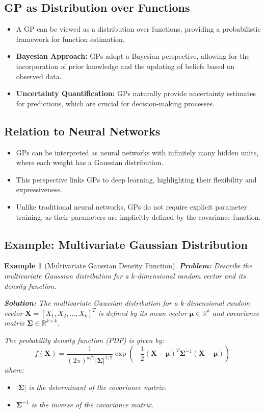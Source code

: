 \documentclass[12pt]{article}
\newtheorem{example}{Example}
\begin{document}
\subsection{GP as Distribution over Functions}
\begin{itemize}
    \item A GP can be viewed as a distribution over functions, providing a probabilistic framework for function estimation.
    \item \textbf{Bayesian Approach:} GPs adopt a Bayesian perspective, allowing for the incorporation of prior knowledge and the updating of beliefs based on observed data.
    \item \textbf{Uncertainty Quantification:} GPs naturally provide uncertainty estimates for predictions, which are crucial for decision-making processes.
\end{itemize}

\subsection{Relation to Neural Networks}
\begin{itemize}
    \item GPs can be interpreted as neural networks with infinitely many hidden units, where each weight has a Gaussian distribution.
    \item This perspective links GPs to deep learning, highlighting their flexibility and expressiveness.
    \item Unlike traditional neural networks, GPs do not require explicit parameter training, as their parameters are implicitly defined by the covariance function.
\end{itemize}

\subsection{Example: Multivariate Gaussian Distribution}
\begin{example}[Multivariate Gaussian Density Function]
    \textbf{Problem:} Describe the multivariate Gaussian distribution for a \( k \)-dimensional random vector and its density function.
    
    \textbf{Solution:}
    The multivariate Gaussian distribution for a \( k \)-dimensional random vector \( \mathbf{X} = [X_1, X_2, \ldots, X_k]^T \) is defined by its mean vector \( \boldsymbol{\mu} \in \mathbb{R}^k \) and covariance matrix \( \mathbf{\Sigma} \in \mathbb{R}^{k \times k} \).
    
    The probability density function (PDF) is given by:
    \[
    f(\mathbf{X}) = \frac{1}{(2\pi)^{k/2} |\mathbf{\Sigma}|^{1/2}} \exp\left( -\frac{1}{2} (\mathbf{X} - \boldsymbol{\mu})^T \mathbf{\Sigma}^{-1} (\mathbf{X} - \boldsymbol{\mu}) \right)
    \]
    where:
    \begin{itemize}
        \item \( |\mathbf{\Sigma}| \) is the determinant of the covariance matrix.
        \item \( \mathbf{\Sigma}^{-1} \) is the inverse of the covariance matrix.
    \end{itemize}
\end{example}
\end{document}
